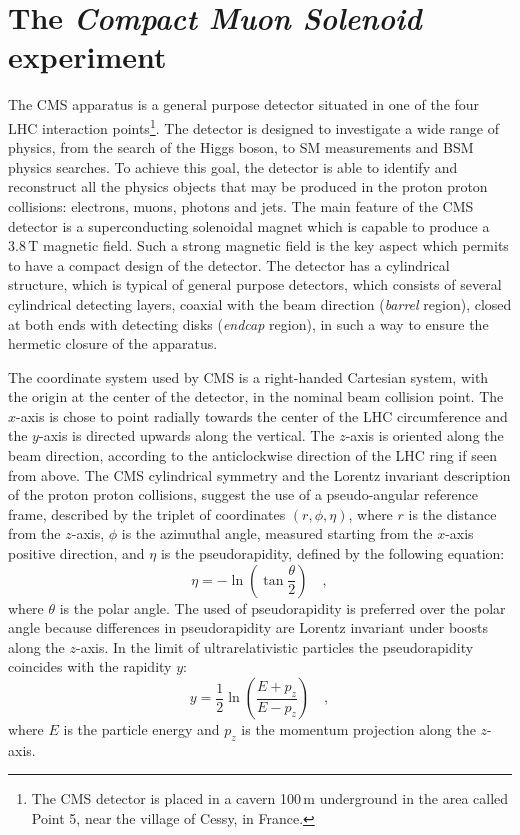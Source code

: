 \section{The \emph{Compact Muon Solenoid} experiment}
\label{sec:CMS}

The CMS apparatus is a general purpose detector situated in one of the four LHC interaction points\footnote{The CMS detector is placed in a cavern 100\,m underground in the area called Point 5, near the village of Cessy, in France.}. The detector is designed to investigate a wide range of physics, from the search of the Higgs boson, to SM measurements and BSM physics searches. To achieve this goal, the detector is able to identify and reconstruct all the physics objects that may be produced in the proton proton collisions: electrons, muons, photons and jets. The main feature of the CMS detector is a superconducting solenoidal magnet which is capable to produce a $3.8$\,T magnetic field. Such a strong magnetic field is the key aspect which permits to have a compact design of the detector. The detector has a cylindrical structure, which is typical of general purpose detectors, which consists of several cylindrical detecting layers, coaxial with the beam direction (\emph{barrel} region), closed at both ends with detecting disks (\emph{endcap} region), in such a way to ensure the hermetic closure of the apparatus.

The coordinate system used by CMS is a right-handed Cartesian system, with the origin at the center of the detector, in the nominal beam collision point. The $x$-axis is chose to point radially towards the center of the LHC circumference and the $y$-axis is directed upwards along the vertical. The $z$-axis is oriented along the beam direction, according to the anticlockwise direction of the LHC ring if seen from above. The CMS cylindrical symmetry and the Lorentz invariant description of the proton proton collisions, suggest the use of a pseudo-angular reference frame, described by the triplet of coordinates $(r,\phi,\eta)$, where $r$ is the distance from the $z$-axis, $\phi$ is the azimuthal angle, measured starting from the $x$-axis positive direction, and $\eta$ is the pseudorapidity, defined by the following equation:
\begin{equation}
\eta = - \ln\left( \tan\frac{\theta}{2}\right) \quad,
\end{equation}
where $\theta$ is the polar angle. The used of pseudorapidity is preferred over the polar angle because differences in pseudorapidity are Lorentz invariant under boosts along the $z$-axis. In the limit of ultrarelativistic particles the pseudorapidity coincides with the rapidity $y$:
\begin{equation}
y = \frac{1}{2}\ln\left(\frac{E+p_z}{E-p_z}\right) \quad ,
\end{equation}
where $E$ is the particle energy and $p_z$ is the momentum projection along the $z$-axis.

